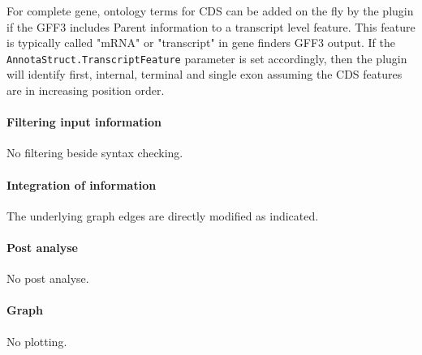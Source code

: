 For complete gene, ontology terms for CDS can be added on the fly by the plugin if the GFF3 includes Parent information to a transcript level feature. This feature is typically called "mRNA" or "transcript" in gene finders GFF3 output.
If the \texttt{AnnotaStruct.TranscriptFeature} parameter is set accordingly, then the plugin will identify first, internal, terminal and single exon assuming the CDS features are in increasing position order.

\paragraph{Filtering input information}

No filtering beside syntax checking.

\paragraph{Integration of information}

The underlying graph edges are directly modified as indicated. 

\paragraph{Post analyse}

No post analyse.

\paragraph{Graph}

No plotting.




